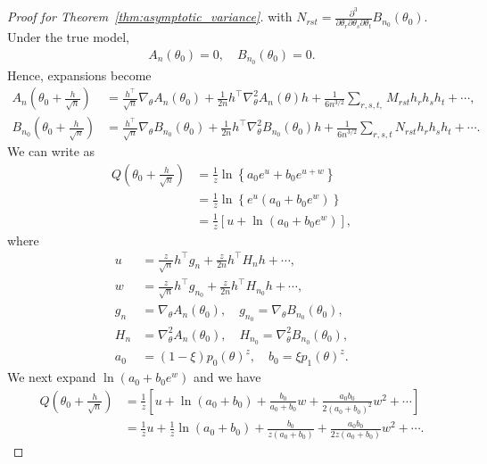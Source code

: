 \documentclass[12pt]{article}
\begin{document}
\begin{proof}[Proof for Theorem~\ref{thm:asymptotic_variance}]
    with $N_{rst} = \frac{\partial^3}{\partial\theta_r\partial\theta_s\partial\theta_t} B_{n_0}(\theta_0)$.
    Under the true model,
    \begin{align*}
        A_n(\theta_0) = 0, \quad B_{n_0}(\theta_0) = 0.
    \end{align*}
    Hence, expansions become
    \begin{align*}
        A_n\left(\theta_0 + \frac{h}{\sqrt{n}}\right) &= \frac{h^\top}{\sqrt{n}}\nabla_\theta A_n(\theta_0) + \frac{1}{2n}h^\top \nabla_\theta^2 A_n(\theta)h + \frac{1}{6n^{3/2}}\sum_{r,s,t,}M_{rst}h_rh_sh_t + \cdots, \\
        B_{n_0}\left(\theta_0 + \frac{h}{\sqrt{n}}\right) &= \frac{h^\top}{\sqrt{n}}\nabla_\theta B_{n_0}(\theta_0) + \frac{1}{2n}h^\top \nabla_\theta^2 B_{n_0}(\theta_0)h + \frac{1}{6n^{3/2}}\sum_{r,s,t}N_{rst}h_rh_sh_t + \cdots.
    \end{align*}
    We can write as
    \begin{align*}
        Q\left(\theta_0 + \frac{h}{\sqrt{n}}\right) &= \frac{1}{z}\ln\left\{a_0 e^u + b_0 e^{u + w}\right\} \\
        &= \frac{1}{z}\ln\left\{e^u(a_0 + b_0 e^w)\right\} \\
        &= \frac{1}{z}\left[u + \ln(a_0 + b_0e^w)\right],
    \end{align*}
    where
    \begin{align*}
        u &= \frac{z}{\sqrt{n}}h^\top g_n + \frac{z}{2n}h^\top H_n h + \cdots, \\
        w &= \frac{z}{\sqrt{n}}h^\top g_{n_0} + \frac{z}{2n}h^\top H_{n_0}h + \cdots, \\
        g_n &= \nabla_\theta A_n(\theta_0), \quad g_{n_0} = \nabla_\theta B_{n_0}(\theta_0), \\
        H_n &= \nabla_\theta^2 A_n(\theta_0), \quad H_{n_0} = \nabla^2_\theta B_{n_0}(\theta_0), \\
        a_0 &= (1 - \xi)p_0(\theta)^z, \quad b_0 = \xi p_1(\theta)^z.
    \end{align*}
    We next expand $\ln(a_0 + b_0 e^w)$ and we have
    \begin{align*}
        Q\left(\theta_0 + \frac{h}{\sqrt{n}}\right) &= \frac{1}{z}\left[u + \ln(a_0 + b_0) + \frac{b_0}{a_0 + b_0}w + \frac{a_0b_0}{2(a_0 + b_0)^2}w^2 + \cdots\right] \\
        &= \frac{1}{z}u + \frac{1}{z}\ln(a_0 + b_0) + \frac{b_0}{z(a_0 + b_0)} + \frac{a_0b_0}{2z(a_0 + b_0)}w^2 + \cdots.
    \end{align*}

\end{proof}
\end{document}

